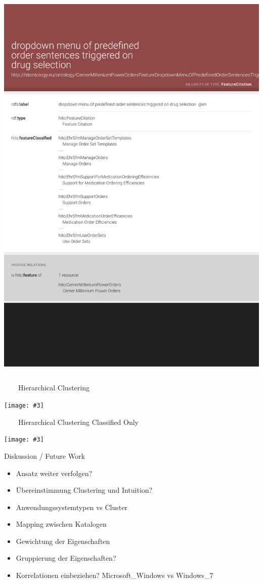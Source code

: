 \documentclass[aspectratio=1610]{beamer}%
\newcommand{\imageslide}[4][]
{
\begin{frame}[plain]{~~~~#2}
\vspace{0.2em}
\begin{center}
\centering\texttt{[image: \#3]}
\end{center}
#1
\note{#4}
\end{frame}
}
\begin{document}
\begin{frame}[plain]
\begin{columns}
\begin{column}{.55\textwidth}
  \centering\includegraphics[width=1.0\textwidth,height=1.0\textheight,keepaspectratio,trim=0 100 0 0,clip]{cernermillenium-lodview-feature.pdf}
 \end{column}
\end{columns}
\end{frame}


\imageslide{Hierarchical Clustering}{hierarchy.pdf}{}
\imageslide{Hierarchical Clustering Classified Only}{hierarchy-classifiedonly.pdf}{}

\begin{frame}{Diskussion / Future Work}
\begin{itemize}
\item Ansatz weiter verfolgen?
\pause
\item Übereinstimmung Clustering und Intuition?
\item Anwendungssystemtypen vs Cluster
\pause
\item Mapping zwischen Katalogen
\pause
\item Gewichtung der Eigenschaften
\item Gruppierung der Eigenschaften?
\item Korrelationen einbeziehen? Microsoft\_Windows vs Windows\_7
\end{itemize}
\end{frame}
\end{document}

